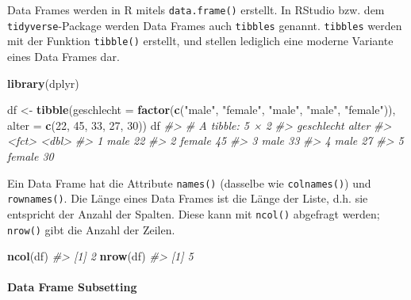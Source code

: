 \documentclass[
]{article}
\newenvironment{Shaded}{\begin{snugshade}}{\end{snugshade}}
\newcommand{\AttributeTok}[1]{\textcolor[rgb]{0.13,0.29,0.53}{#1}}
\newcommand{\CommentTok}[1]{\textcolor[rgb]{0.56,0.35,0.01}{\textit{#1}}}
\newcommand{\DecValTok}[1]{\textcolor[rgb]{0.00,0.00,0.81}{#1}}
\newcommand{\FunctionTok}[1]{\textcolor[rgb]{0.13,0.29,0.53}{\textbf{#1}}}
\newcommand{\NormalTok}[1]{#1}
\newcommand{\OtherTok}[1]{\textcolor[rgb]{0.56,0.35,0.01}{#1}}
\newcommand{\StringTok}[1]{\textcolor[rgb]{0.31,0.60,0.02}{#1}}
\begin{document}
Data Frames werden in R mitels \texttt{data.frame()} erstellt. In
RStudio bzw. dem \texttt{tidyverse}-Package werden Data Frames auch
\texttt{tibbles} genannt. \texttt{tibbles} werden mit der Funktion
\texttt{tibble()} erstellt, und stellen lediglich eine moderne Variante
eines Data Frames dar.

\begin{Shaded}
\begin{Highlighting}[]
\FunctionTok{library}\NormalTok{(dplyr)}

\NormalTok{df }\OtherTok{\textless{}{-}} \FunctionTok{tibble}\NormalTok{(}\AttributeTok{geschlecht =} \FunctionTok{factor}\NormalTok{(}\FunctionTok{c}\NormalTok{(}\StringTok{"male"}\NormalTok{, }\StringTok{"female"}\NormalTok{,}
                                       \StringTok{"male"}\NormalTok{, }\StringTok{"male"}\NormalTok{,}
                                       \StringTok{"female"}\NormalTok{)),}
                 \AttributeTok{alter =} \FunctionTok{c}\NormalTok{(}\DecValTok{22}\NormalTok{, }\DecValTok{45}\NormalTok{, }\DecValTok{33}\NormalTok{, }\DecValTok{27}\NormalTok{, }\DecValTok{30}\NormalTok{))}
\NormalTok{df}
\CommentTok{\#\textgreater{} \# A tibble: 5 × 2}
\CommentTok{\#\textgreater{}   geschlecht alter}
\CommentTok{\#\textgreater{}   \textless{}fct\textgreater{}      \textless{}dbl\textgreater{}}
\CommentTok{\#\textgreater{} 1 male          22}
\CommentTok{\#\textgreater{} 2 female        45}
\CommentTok{\#\textgreater{} 3 male          33}
\CommentTok{\#\textgreater{} 4 male          27}
\CommentTok{\#\textgreater{} 5 female        30}
\end{Highlighting}
\end{Shaded}

Ein Data Frame hat die Attribute \texttt{names()} (dasselbe wie
\texttt{colnames()}) und \texttt{rownames()}. Die Länge eines Data
Frames ist die Länge der Liste, d.h. sie entspricht der Anzahl der
Spalten. Diese kann mit \texttt{ncol()} abgefragt werden;
\texttt{nrow()} gibt die Anzahl der Zeilen.

\begin{Shaded}
\begin{Highlighting}[]
\FunctionTok{ncol}\NormalTok{(df)}
\CommentTok{\#\textgreater{} [1] 2}
\FunctionTok{nrow}\NormalTok{(df)}
\CommentTok{\#\textgreater{} [1] 5}
\end{Highlighting}
\end{Shaded}

\hypertarget{data-frame-subsetting}{%
\paragraph{Data Frame Subsetting}\label{data-frame-subsetting}}
\end{document}
